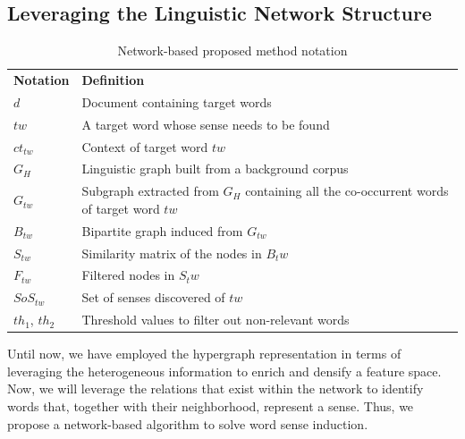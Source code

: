 \subsection{Leveraging the Linguistic Network Structure}
\begin{table}[]
\centering
\begin{tabular}{ll}
\textbf{Notation} & \textbf{Definition}                                                                     \\
$d$               & Document containing target words                                                        \\
$tw$              & A target word whose sense needs to be found                                             \\
$ct_{tw}$         & Context of target word $tw$                                                             \\
$G_H$             & Linguistic graph built from a background corpus                                         \\
$G_{tw}$          & Subgraph extracted from $G_H$ containing all the co-occurrent words of target word $tw$ \\
$B_{tw}$          & Bipartite graph induced from $G_{tw}$                                                   \\
$S_{tw}$          & Similarity matrix of the nodes in $B_tw$                                                \\
$F_{tw}$          & Filtered nodes in $S_tw$                                                                \\
$SoS_{tw}$        & Set of senses discovered of $tw$                                                        \\
$th_1$, $th_2$    & Threshold values to filter out non-relevant words                                      
\end{tabular}
\caption{Network-based proposed method notation}
\label{tab:proposed_notation}
\end{table}


Until now, we have employed the hypergraph representation in terms of leveraging the heterogeneous information to enrich and densify a feature space.
Now, we will leverage the relations that exist within the network to identify words that, together with their neighborhood, represent a sense. Thus, we propose a network-based algorithm to solve word sense induction. 






